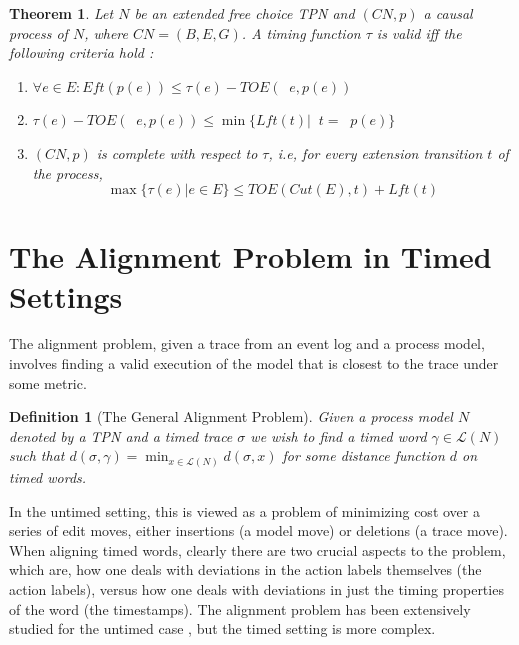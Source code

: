 \documentclass[conference]{IEEEtran}
\DeclareMathOperator*{\pre}{^\bullet}
\newtheorem{theorem}{Theorem}
\newtheorem{definition}{Definition}
\begin{document}
\begin{theorem}\label{thm35}
	Let $N$ be an extended free choice TPN and $(CN, p)$ a causal process of $N$, where $CN = (B, E, G)$. A timing function $\tau$ is valid iff the following criteria hold : 
	
	\begin{enumerate}
		\item$ \forall e \in E :  Eft(p(e)) \leq \tau(e) - TOE(\pre e, p(e))$
		\item $\tau(e) - TOE(\pre e, p(e)) \leq  \min \{Lft(t) | \pre t = \pre p(e)\}$
		\item $(CN, p)$ is complete with respect to $\tau$, i.e, for every extension transition $t$ of the process, $$\max\{\tau(e)| e \in E\} \leq TOE(Cut(E), t) + Lft(t)$$
		
	\end{enumerate}
\end{theorem}

	\section{The Alignment Problem in Timed Settings}\label{2}
The alignment problem, given a trace from an event log and a process model, involves finding a valid execution of the model that is closest to the trace under some metric.

\begin{definition}[The General Alignment Problem]
	Given a process model $N$ denoted by a TPN and a timed trace $\sigma$ we wish to find a timed word $\gamma \in \mathcal{L}(N)$ such that $d(\sigma, \gamma) = \min_{x \in \mathcal{L}(N)} d(\sigma, x)$ for some distance function $d$ on timed words. 
	
\end{definition}

In the untimed setting, this is viewed as a problem of minimizing cost over a series of edit moves, either insertions (a model move) or deletions (a trace move). When aligning timed words, clearly there are two crucial aspects to the problem, which are, how one deals with deviations in the action labels themselves (the action labels), versus how one deals with deviations in just the timing properties of the word (the timestamps). The alignment problem has been extensively studied for the untimed case \cite{Adriansyah2014AligningOA} \cite{BCC21}, %
but the timed setting is more complex. 
\end{document}
